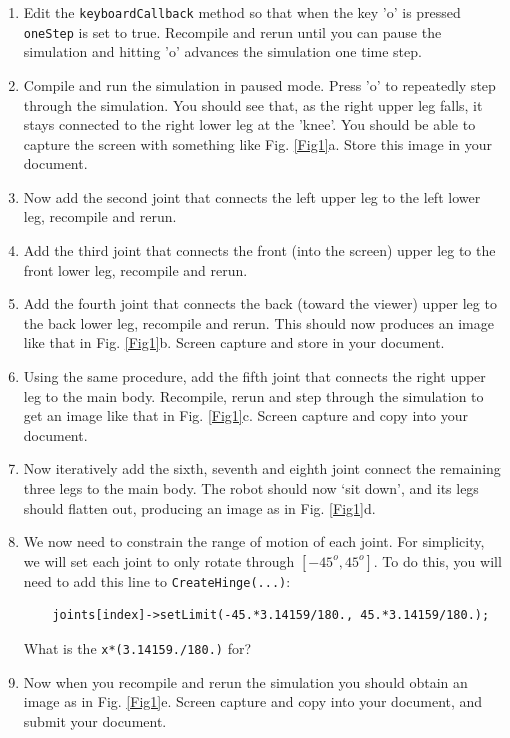 \documentclass[12pt]{article}
\begin{document}
\begin{enumerate}
\item Edit the \verb|keyboardCallback| method so that when the key 'o' is pressed \verb|oneStep| is set to true.  Recompile and rerun until you can pause the simulation and hitting 'o' advances the simulation one time step.

\item Compile and run the simulation in paused mode.  Press 'o' to repeatedly step through the simulation.  You should see that, as the right upper leg falls, it stays connected to the right lower leg at the 'knee'.  You should be able to capture the screen with something like Fig. \ref{Fig1}a. Store this image in your document.

\item Now add the second joint that connects the left upper leg to the left lower leg, recompile and rerun.

\item Add the third joint that connects the front (into the screen) upper leg to the front lower leg, recompile and rerun.

\item Add the fourth joint that connects the back (toward the viewer) upper leg to the back lower leg, recompile and rerun. This should now produces an image like that in Fig. \ref{Fig1}b. Screen capture and store in your document.

\item Using the same procedure, add the fifth joint that connects the right upper leg to the main body. Recompile, rerun and step through the simulation to get an image like that in Fig. \ref{Fig1}c. Screen capture and copy into your document.

\item Now iteratively add the sixth, seventh and eighth joint connect the remaining three legs to the main body. The robot should now `sit down', and its legs should flatten out, producing an image as in Fig. \ref{Fig1}d.

\item We now need to constrain the range of motion of each joint. For simplicity, we will set each joint to only rotate through $[-45^o,45^o]$. To do this, you will need to add this line to \texttt{CreateHinge(...)}: 

  \begin{verbatim}
    joints[index]->setLimit(-45.*3.14159/180., 45.*3.14159/180.);
  \end{verbatim}
  What is the \texttt{x*(3.14159./180.)} for?

\item Now when you recompile and rerun the simulation you should obtain an image as in Fig. \ref{Fig1}e. Screen capture and copy into your document, and submit your document.

\end{enumerate}
\end{document}
